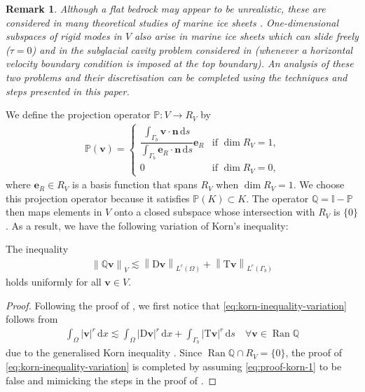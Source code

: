 \documentclass[onefignum,onetabnum]{siamart190516}
\newcommand{\be}{\boldsymbol{e}}
\newcommand{\bn}{\boldsymbol{n}}
\newcommand{\bv}{\boldsymbol{v}}
\newcommand{\bT}{\boldsymbol{\mathrm{T}}}
\newcommand{\bD}{\boldsymbol{\mathrm{D}}}
\newcommand{\dd}{\mathrm{d}}
\newcommand{\bbP}{\mathbb{P}}
\newcommand{\bbQ}{\mathbb{Q}}
\newcommand{\bbI}{\mathbb{I}}
\newcommand{\nrm}[1]{\left\lVert#1\right\rVert}
\DeclareMathOperator*{\Ran}{Ran}
\newtheorem{remark}[theorem]{Remark}
\begin{document}
\begin{remark}\label{remark:subglacial_cavitation}
	Although a flat bedrock may appear to be unrealistic, these are considered in many theoretical studies of marine ice sheets \cite{schoof2007a,pattyn2012,stubblefield2021}. One-dimensional subspaces of rigid modes in $V$ also arise in marine ice sheets which can slide freely ($\tau = 0$) and in the subglacial cavity problem considered in \cite{gagliardini2007, dediego2022} (whenever a horizontal velocity boundary condition is imposed at the top boundary). An analysis of these two problems and their discretisation can be completed using the techniques and steps presented in this paper.
\end{remark}

We define the projection operator $\bbP:V\to R_V$ by
%
\begin{align*}
	\bbP(\bv) = \begin{cases}
		\dfrac{\int_{\Gamma_b} \bv\cdot\bn\,\dd s}{\int_{\Gamma_b} \be_R\cdot\bn\,\dd s} \be_R & \text{if $\dim{R_V} = 1$,} \\
		0 & \text{if $\dim{R_V} = 0$,}
	\end{cases}
\end{align*}
%
where $\be_R\in R_V$ is a basis function that spans $R_V$ when $\dim{R_V} = 1$. We choose this projection operator because it satisfies $\bbP(K) \subset K$. The operator $\bbQ = \bbI - \bbP$ then maps elements in $V$ onto a closed subspace whose intersection with $R_V$ is $\{0\}$. As a result, we have the following variation of Korn's inequality:

\begin{lemma}
	The inequality
	\begin{align}\label{eq:korn-inequality-variation}
		\nrm{\bbQ\bv}_V \lesssim \nrm{\bD\bv}_{L^r(\Omega)} + \nrm{\bT\bv}_{L^r(\Gamma_b)}
	\end{align}
	holds uniformly for all $\bv\in V$.
\end{lemma}

\begin{proof}
	Following the proof of \cite[Lemma 3]{chen2013}, we first notice that \eqref{eq:korn-inequality-variation} follows from 
	\begin{align}\label{eq:proof-korn-1}
		\int_\Omega |\bv|^r\,\dd x \lesssim \int_\Omega |\bD\bv|^r\,\dd x + \int_{\Gamma_b} |\bT\bv|^r\,\dd s \quad \forall \bv \in \Ran{\bbQ}
	\end{align}
	due to the generalised Korn inequality \cite[Lemma 2]{chen2013}. Since $\Ran{\bbQ}\cap R_V = \{0\}$, the proof of \eqref{eq:korn-inequality-variation} is completed by assuming \eqref{eq:proof-korn-1} to be false and mimicking the steps in the proof of \cite[Lemma 3]{chen2013}.
\end{proof}
\end{document}
